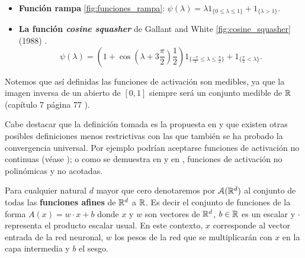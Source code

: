\begin{definicion}
\begin{itemize}
        \item \textbf{Función rampa} \ref{fig:funciones_rampa}: $\psi(\lambda)  = \lambda 1_{\{0 \leq \lambda \leq  1\}} + 1_{\{\lambda > 1\}}.$
    
        \item \textbf{La función \textit{cosine squasher}} de Gallant and White 
        \ref{fig:cosine_squasher} (1988) \cite{Gallant88thereexists}. 
        \begin{equation*}
    \psi(\lambda )= \left(1 + \cos\left(\lambda + 3 \frac{\pi}{2} \right) \frac{1}{2}\right) 
     1_{\{\frac{-\pi}{2} \leq \lambda \leq  \frac{\pi}{2}\}}
     +
     1_{\{ \frac{\pi}{2} < \lambda \}}.
    \end{equation*}
    \end{itemize}

   Notemos que así definidas las funciones de activación son medibles, ya que la imagen inversa de un abierto de $[0,1]$ siempre será un conjunto medible de  $\mathbb{R}$  (capítulo 7  página 77 \cite{nla.cat-vn1819421}).
    

    Cabe destacar que la definición tomada es la propuesta en \cite{HORNIK1989359} y que existen
    otras posibles definiciones menos restrictivas con las que también se ha probado la convergencia universal.
    Por ejemplo podrían aceptarse funciones de activación no continuas (véase \cite{FUNAHASHI1989183}); 
    o como 
    se demuestra en \cite{DBLP:journals/corr/SonodaM15} y en \cite{non-polynomial-activation-functions}, funciones de activación no polinómicas y no acotadas. 
 
\end{definicion}



Para cualquier natural $d$ mayor que cero  denotaremos por $\mathcal{A}(\mathbb{R}^d)$ al conjunto de todas 
las \textbf{funciones afines} de $\mathbb{R}^d$ a $\mathbb{R}$. Es decir el conjunto de funciones de la forma 
$A(x) = w \cdot x + b$ donde $x$ y $w$ son vectores de $\mathbb{R}^d$,  $b \in \mathbb{R}$ es un escalar
 y $\cdot$ representa el producto escalar
usual. En este contexto, $x$ corresponde al vector entrada de la red neuronal, $w$ los pesos de la red
que se multiplicarán con $x$ en la capa intermedia y $b$ el sesgo. 

